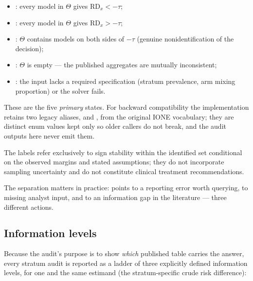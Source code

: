 \documentclass[article]{ajs}
\begin{document}
\begin{itemize}
\item {}: every model in $\Theta$ gives
      $\mathrm{RD}_x < -\tau$;
\item {}: every model in $\Theta$ gives
      $\mathrm{RD}_x > -\tau$;
\item {}: $\Theta$ contains models on both sides of
      $-\tau$ (genuine nonidentification of the decision);
\item {}: $\Theta$ is empty --- the published aggregates
      are mutually inconsistent;
\item {}: the input lacks a required specification
      (stratum prevalence, arm mixing proportion) or the solver fails.
\end{itemize}

These are the five \emph{primary} states. For backward compatibility
the implementation retains two legacy aliases,  and
, from the original IONE vocabulary; they are
distinct enum values kept only so older callers do not break, and the
audit outputs here never emit them.

The  labels refer exclusively to sign stability within
the identified set conditional on the observed margins and stated
assumptions; they do not incorporate sampling uncertainty and do not
constitute clinical treatment recommendations.

The separation matters in practice:  points to a
reporting error worth querying,  to missing analyst
input, and  to an information gap in the literature
--- three different actions.

\subsection{Information levels}
\label{sec:levels}

Because the audit's purpose is to show \emph{which} published table
carries the answer, every stratum audit is reported as a ladder of
three explicitly defined information levels, for one and the same
estimand (the stratum-specific crude risk difference):
\end{document}
